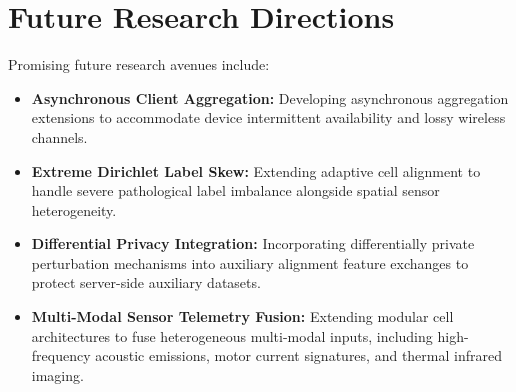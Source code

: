 \documentclass[12pt,a4paper]{report}
\begin{document}
\section{Future Research Directions}
Promising future research avenues include:
\begin{itemize}
    \item \textbf{Asynchronous Client Aggregation:} Developing asynchronous aggregation extensions to accommodate device intermittent availability and lossy wireless channels.
    \item \textbf{Extreme Dirichlet Label Skew:} Extending adaptive cell alignment to handle severe pathological label imbalance alongside spatial sensor heterogeneity.
    \item \textbf{Differential Privacy Integration:} Incorporating differentially private perturbation mechanisms into auxiliary alignment feature exchanges to protect server-side auxiliary datasets.
    \item \textbf{Multi-Modal Sensor Telemetry Fusion:} Extending modular cell architectures to fuse heterogeneous multi-modal inputs, including high-frequency acoustic emissions, motor current signatures, and thermal infrared imaging.
\end{itemize}
\end{document}
